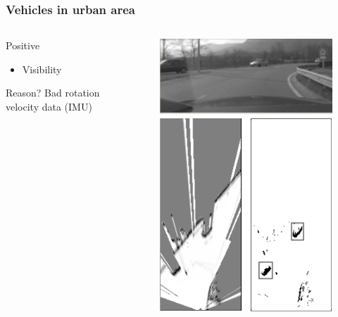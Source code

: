 \documentclass{beamer}
\begin{document}
	\begin{frame}
		\frametitle{Vehicles in urban area}
		
		\begin{columns}[t]
			\begin{column}[t]{5cm}
				\begin{exampleblock}{Positive}
				\begin{itemize}
				\item Visibility
				\end{itemize}
				\end{exampleblock}
				\begin{block}{Reason?}
				Bad rotation velocity data (IMU)
				\end{block}
			\end{column}
			\begin{column}[t]{5cm}
				\begin{figure}[h]
				\center
				\includegraphics[scale=0.55]{../img/fig:result:scenetwocars}
				\end{figure}
			\end{column}
		\end{columns}		

	\end{frame}
\end{document}
